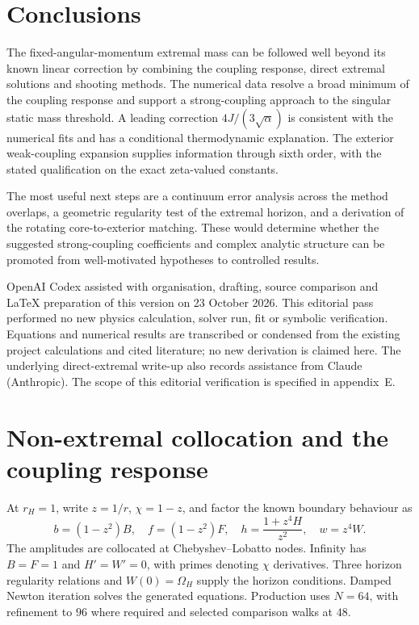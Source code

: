 \documentclass[11pt,a4paper]{article}
\begin{document}
\section{Conclusions}
The fixed-angular-momentum extremal mass can be followed well beyond its known linear correction by combining the coupling response, direct extremal solutions and shooting methods. The numerical data resolve a broad minimum of the coupling response and support a strong-coupling approach to the singular static mass threshold. A leading correction $4J/(3\sqrt\alpha)$ is consistent with the numerical fits and has a conditional thermodynamic explanation. The exterior weak-coupling expansion supplies information through sixth order, with the stated qualification on the exact zeta-valued constants.

The most useful next steps are a continuum error analysis across the method overlaps, a geometric regularity test of the extremal horizon, and a derivation of the rotating core-to-exterior matching. These would determine whether the suggested strong-coupling coefficients and complex analytic structure can be promoted from well-motivated hypotheses to controlled results.

\acknowledgments
OpenAI Codex assisted with organisation, drafting, source comparison and LaTeX preparation of this version on 23 October 2026. This editorial pass performed no new physics calculation, solver run, fit or symbolic verification. Equations and numerical results are transcribed or condensed from the existing project calculations and cited literature; no new derivation is claimed here. The underlying direct-extremal write-up also records assistance from Claude (Anthropic). The scope of this editorial verification is specified in appendix~E.

\appendix
\section{Non-extremal collocation and the coupling response}
\label{app:nonext}
At $r_H=1$, write $z=1/r$, $\chi=1-z$, and factor the known boundary behaviour as
\begin{equation}
 b=(1-z^2)B,\quad f=(1-z^2)F,\quad
 h=\frac{1+z^4H}{z^2},\quad w=z^4W.
\end{equation}
The amplitudes are collocated at Chebyshev--Lobatto nodes. Infinity has $B=F=1$ and $H'=W'=0$, with primes denoting $\chi$ derivatives. Three horizon regularity relations and $W(0)=\Omega_H$ supply the horizon conditions. Damped Newton iteration solves the generated equations. Production uses $N=64$, with refinement to $96$ where required and selected comparison walks at $48$.
\end{document}

